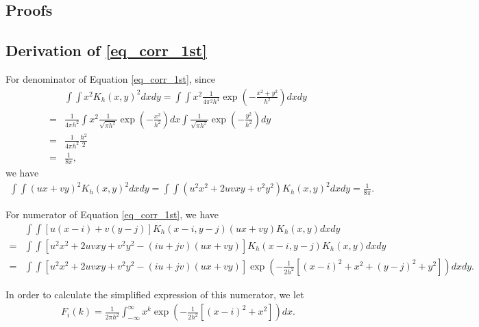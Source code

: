 \documentclass{article}
\begin{document}
\begin{appendices}
	\section{Proofs}
	\subsection{Derivation of \eqref{eq_corr_1st}}
	\label{Derive_1st_corr}
	For denominator of Equation \ref{eq_corr_1st}, since 
	\begin{equation*}
		\begin{aligned}
			&\int\int x^2K_{h}(x,y)^2dxdy=\int\int x^2\frac{1}{4\pi^2h^4}\exp(-\frac{x^2+y^2}{h^2})dxdy\\
			=&\frac{1}{4\pi h^2}\int x^2\frac{1}{\sqrt{\pi h^2}}\exp(-\frac{x^2}{h^2})dx\int \frac{1}{\sqrt{\pi h^2}}\exp(-\frac{y^2}{h^2})dy\\
			=&\frac{1}{4\pi h^2}\frac{h^2}{2}\\
			=&\frac{1}{8\pi},
		\end{aligned}
	\end{equation*}
	we have 
	\begin{equation*}
		\begin{aligned}
			\int\int(ux+vy)^2K_{h}(x,y)^2dxdy
			=\int\int(u^2x^2+2uvxy+v^2y^2)K_{h}(x,y)^2dxdy
			=\frac{1}{8\pi}.
		\end{aligned}
	\end{equation*}
	
	For numerator of Equation \ref{eq_corr_1st}, we have 
	\begin{equation*}
		\begin{aligned}
			&\int\int[u(x-i)+v(y-j)]K_{h}(x-i,y-j)(ux+vy)K_{h}(x,y)dxdy\\
			=&\int\int[u^2x^2+2uvxy+v^2y^2-(iu+jv)(ux+vy)]K_{h}(x-i,y-j)K_{h}(x,y)dxdy\\
			=&\int\int[u^2x^2+2uvxy+v^2y^2-(iu+jv)(ux+vy)]\exp(-\frac{1}{2h^2}[(x-i)^2+x^2+(y-j)^2+y^2])dxdy.
		\end{aligned}
	\end{equation*}
	
	In order to calculate the simplified expression of this numerator, we let
	\begin{equation}
		\label{eq_calc_F}
		\begin{aligned}
			F_{i}(k)=\frac{1}{2\pi h^2}\int_{-\infty}^{\infty}x^k\exp(-\frac{1}{2h^2}[(x-i)^2+x^2])dx.
		\end{aligned}
	\end{equation}
	

\end{appendices}
\end{document}
